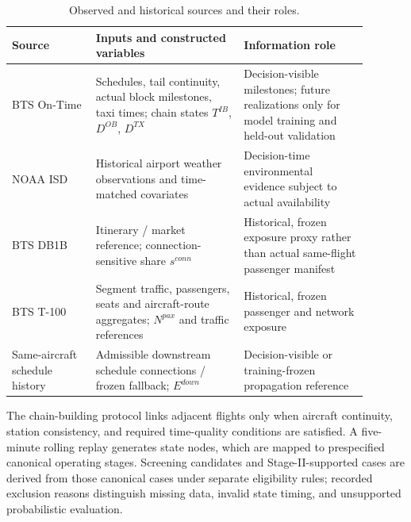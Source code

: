\documentclass[10pt,a4paper]{article}
\numberwithin{equation}{section}
\begin{document}
\begin{table}[htbp]\centering\footnotesize
\caption{Observed and historical sources and their roles.}\label{tab:sup_sources}
\begin{tabular}{p{0.21\linewidth}p{0.37\linewidth}p{0.31\linewidth}}\toprule
Source & Inputs and constructed variables & Information role \\\midrule
BTS On-Time & Schedules, tail continuity, actual block milestones, taxi times; chain states $T^{IB}$, $D^{OB}$, $D^{TX}$ & Decision-visible milestones; future realizations only for model training and held-out validation \\
NOAA ISD & Historical airport weather observations and time-matched covariates & Decision-time environmental evidence subject to actual availability \\
BTS DB1B & Itinerary / market reference; connection-sensitive share $s^{conn}$ & Historical, frozen exposure proxy rather than actual same-flight passenger manifest \\
BTS T-100 & Segment traffic, passengers, seats and aircraft-route aggregates; $N^{pax}$ and traffic references & Historical, frozen passenger and network exposure \\
Same-aircraft schedule history & Admissible downstream schedule connections / frozen fallback; $E^{down}$ & Decision-visible or training-frozen propagation reference \\\bottomrule
\end{tabular}\end{table}

The chain-building protocol links adjacent flights only when aircraft continuity, station consistency, and required time-quality conditions are satisfied. A five-minute rolling replay generates state nodes, which are mapped to prespecified canonical operating stages. Screening candidates and Stage-II-supported cases are derived from those canonical cases under separate eligibility rules; recorded exclusion reasons distinguish missing data, invalid state timing, and unsupported probabilistic evaluation.
\end{document}
